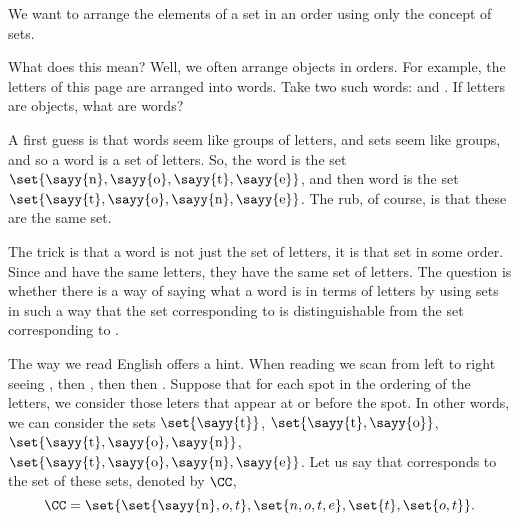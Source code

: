 

We want to arrange the elements of a set in an order using only the concept of sets.


What does this mean?  Well, we often arrange objects in orders.
For example, the letters of this page are arranged into words.
Take two such words:  and .
If letters are objects, what are words?

A first guess is that words seem like groups of letters, and sets seem like groups, and so a word is a set of letters.
So, the word  is the set $\set{\text{\sayy{n}}, \text{\sayy{o}}, \text{\sayy{t}}, \text{\sayy{e}}}$, and then word  is the set
$\set{\text{\sayy{t}}, \text{\sayy{o}}, \text{\sayy{n}}, \text{\sayy{e}}}$.
The rub, of course, is that these are the same set.

The trick is that a word is not just the set of letters, it is that set in some order.
Since  and  have the same letters, they have the same set of letters.
The question is whether there is a way of saying what a word is in terms of letters by using sets in such a way that the set corresponding to  is distinguishable from the set corresponding to .

The way we read English offers a hint.
When reading  we scan from left to right seeing , then , then  then .
Suppose that for each spot in the ordering of the letters, we consider those leters that appear at or before the spot.
In other words, we can consider the sets $\set{\text{\sayy{t}}}$, $\set{\text{\sayy{t}}, \text{\sayy{o}}}$, $\set{\text{\sayy{t}}, \text{\sayy{o}}, \text{\sayy{n}}}$, $\set{\text{\sayy{t}}, \text{\sayy{o}}, \text{\sayy{n}}, \text{\sayy{e}}}$.
Let us say that  corresponds to the set of these sets, denoted by $\CC$,
\[
  \CC = \set{\set{\text{\sayy{n}}, o, t}, \set{n, o, t, e}, \set{t}, \set{o, t}}.
\]

